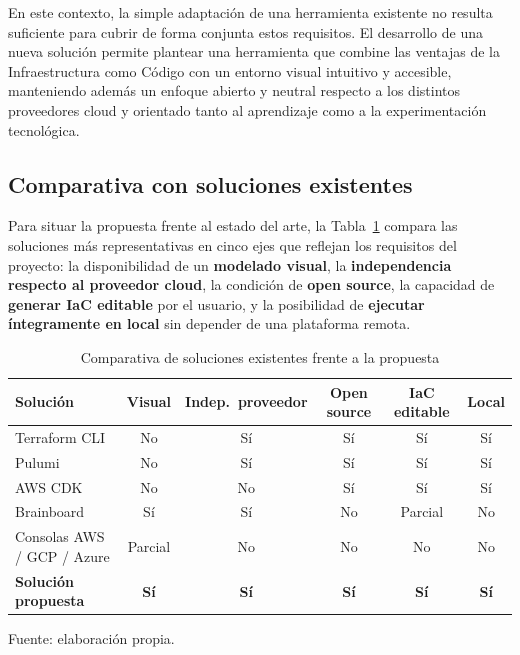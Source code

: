 \documentclass{article}
\begin{document}
{        \justify
        En este contexto, la simple adaptación de una herramienta existente no resulta suficiente para cubrir de forma conjunta estos requisitos. El desarrollo de una nueva solución permite plantear una herramienta que combine las ventajas de la Infraestructura como Código con un entorno visual intuitivo y accesible, manteniendo además un enfoque abierto y neutral respecto a los distintos proveedores cloud y orientado tanto al aprendizaje como a la experimentación tecnológica.
        \par

        \subsection{Comparativa con soluciones existentes}
        \justify
        Para situar la propuesta frente al estado del arte, la Tabla~\ref{tab:comparativa_soluciones}
        compara las soluciones más representativas en cinco ejes que reflejan los requisitos del
        proyecto: la disponibilidad de un \textbf{modelado visual}, la \textbf{independencia
        respecto al proveedor cloud}, la condición de \textbf{open source}, la capacidad de
        \textbf{generar IaC editable} por el usuario, y la posibilidad de \textbf{ejecutar
        íntegramente en local} sin depender de una plataforma remota.

        \begin{table}[H]
        \centering
        \small
        \begin{tabular}{lccccc}
        \toprule
        \textbf{Solución} & \textbf{Visual} & \textbf{Indep.\ proveedor} & \textbf{Open source} & \textbf{IaC editable} & \textbf{Local} \\
        \midrule
        Terraform CLI               & No      & Sí      & Sí      & Sí      & Sí \\
        Pulumi                      & No      & Sí      & Sí      & Sí      & Sí \\
        AWS CDK                     & No      & No      & Sí      & Sí      & Sí \\
        Brainboard                  & Sí      & Sí      & No      & Parcial & No \\
        Consolas AWS / GCP / Azure  & Parcial & No      & No      & No      & No \\
        \midrule
        \textbf{Solución propuesta} & \textbf{Sí} & \textbf{Sí} & \textbf{Sí} & \textbf{Sí} & \textbf{Sí} \\
        \bottomrule
        \end{tabular}
        \caption{Comparativa de soluciones existentes frente a la propuesta}
        \label{tab:comparativa_soluciones}
        \footnotesize Fuente: elaboración propia.
        \end{table}

}
\end{document}
